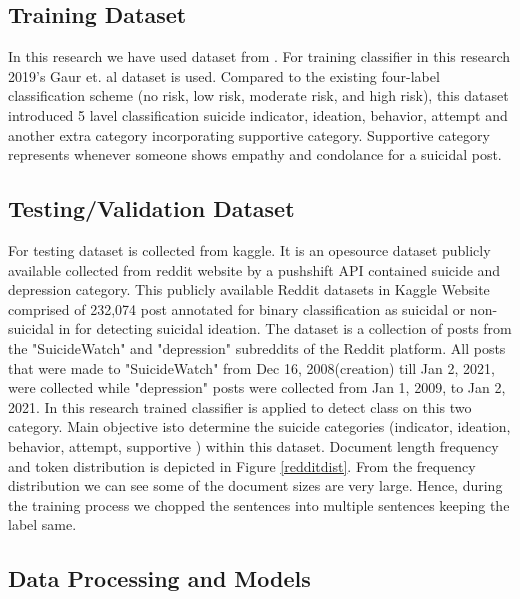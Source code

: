 \documentclass[sn-mathphys,Numbered]{sn-jnl}%
\theoremstyle{thmstyleone}%
\theoremstyle{thmstyletwo}%
\theoremstyle{thmstylethree}%
\begin{document}
\subsection{Training Dataset}
In this research we have used dataset from \cite{gaur2019knowledge}. For training classifier in this research 2019's Gaur et. al \cite{gaur2019knowledge} dataset is used. Compared to the existing four-label classification scheme (no risk, low risk, moderate risk, and high risk), this dataset introduced 5 lavel classification suicide indicator, ideation, behavior, attempt and another extra category incorporating supportive category. Supportive category represents whenever someone shows empathy and condolance for a suicidal post. 

\subsection{Testing/Validation Dataset} 
For testing dataset is collected from kaggle. It is an opesource dataset publicly available collected from reddit website by a pushshift API contained suicide and depression category.  This publicly available Reddit datasets in Kaggle Website comprised of 232,074 post annotated for binary classification as suicidal or non-suicidal in \cite{aldhyani2022detecting} for detecting suicidal ideation. The dataset is a collection of posts from the "SuicideWatch" and "depression" subreddits of the Reddit platform. All posts that were made to "SuicideWatch" from Dec 16, 2008(creation) till Jan 2, 2021, were collected while "depression" posts were collected from Jan 1, 2009, to Jan 2, 2021. In this research trained classifier is applied to detect class on this two category. Main objective isto determine the suicide categories (indicator, ideation, behavior, attempt, supportive ) within this dataset. Document length frequency and token distribution is depicted in Figure \ref{redditdist}. From the frequency distribution we can see some of the document sizes are very large. Hence, during the training process we chopped the sentences into multiple sentences keeping the label same. 

\subsection{Data Processing and Models}
\end{document}
